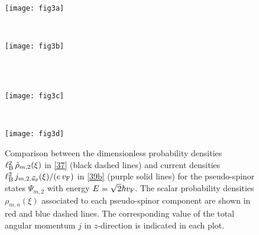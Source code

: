 \documentclass[aps,showpacs,showkeys]{revtex4}
\begin{document}
\begin{figure}[htb]
	\centering
	\begin{minipage}[b]{0.3\textwidth}
		\hspace{0.1cm}
		\texttt{[image: fig3a]}\\
		\label{fig:rho_j_20}
	\end{minipage}
\hspace{3cm}
	~ 
	\begin{minipage}[b]{0.3\textwidth}
		\texttt{[image: fig3b]}\\
		\label{fig:rho_j_21}
	\end{minipage}
	\\ [3ex]
	~ 
	\begin{minipage}[b]{0.34\textwidth}
		\texttt{[image: fig3c]}\\
		\label{fig:rho_j_22}
	\end{minipage}
\hspace{3cm}
	~ 
	\begin{minipage}[b]{0.34\textwidth}
		\texttt{[image: fig3d]}\\
		\label{fig:rho_j_23}
	\end{minipage}
	\caption{\label{fig:rho_j_2M}Comparison between the dimensionless probability densities $\ell_{\rm B}^{2}\, \tilde{\rho}_{m,2}(\xi)$ in \eqref{37} (black dashed lines) and current densities $\ell_{\rm B}^{2}\, j_{m,2,\vec{u}_\theta}(\xi) /(e\,v_{\rm F})$ in \eqref{39b} (purple solid lines) for the pseudo-spinor states $\Psi_{m,2}$ with energy $E=\sqrt{2}\hbar v_{\rm F}$. The scalar probability densities $\rho_{m,n}(\xi)$ associated to each pseudo-spinor component are shown in red and blue dashed lines. The corresponding value of the total angular momentum $j$ in $z$-direction is indicated in each plot.}
\end{figure} 
\end{document}
